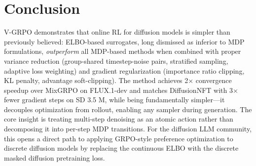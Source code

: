 \documentclass[11pt]{article}
\begin{document}
\section{Conclusion}

V-GRPO demonstrates that online RL for diffusion models is simpler than previously believed: ELBO-based surrogates, long dismissed as inferior to MDP formulations, \emph{outperform} all MDP-based methods when combined with proper variance reduction (group-shared timestep-noise pairs, stratified sampling, adaptive loss weighting) and gradient regularization (importance ratio clipping, KL penalty, advantage soft-clipping). The method achieves 2$\times$ convergence speedup over MixGRPO on FLUX.1-dev and matches DiffusionNFT with 3$\times$ fewer gradient steps on SD 3.5 M, while being fundamentally simpler---it decouples optimization from rollout, enabling any sampler during generation. The core insight is treating multi-step denoising as an atomic action rather than decomposing it into per-step MDP transitions. For the diffusion LLM community, this opens a direct path to applying GRPO-style preference optimization to discrete diffusion models by replacing the continuous ELBO with the discrete masked diffusion pretraining loss.
\end{document}
